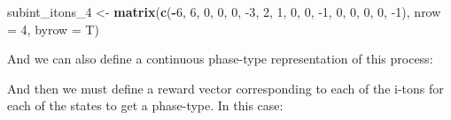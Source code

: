\documentclass[]{article}
\newenvironment{Shaded}{\begin{snugshade}}{\end{snugshade}}
\newcommand{\CommentTok}[1]{\textcolor[rgb]{0.56,0.35,0.01}{\textit{#1}}}
\newcommand{\DataTypeTok}[1]{\textcolor[rgb]{0.13,0.29,0.53}{#1}}
\newcommand{\DecValTok}[1]{\textcolor[rgb]{0.00,0.00,0.81}{#1}}
\newcommand{\KeywordTok}[1]{\textcolor[rgb]{0.13,0.29,0.53}{\textbf{#1}}}
\newcommand{\NormalTok}[1]{#1}
\newcommand{\OperatorTok}[1]{\textcolor[rgb]{0.81,0.36,0.00}{\textbf{#1}}}
\newcommand{\StringTok}[1]{\textcolor[rgb]{0.31,0.60,0.02}{#1}}
\begin{document}
\begin{Shaded}
\begin{Highlighting}[]
\NormalTok{subint_itons_}\DecValTok{4}\NormalTok{ <-}\StringTok{ }\KeywordTok{matrix}\NormalTok{(}\KeywordTok{c}\NormalTok{(}\OperatorTok{-}\DecValTok{6}\NormalTok{, }\DecValTok{6}\NormalTok{, }\DecValTok{0}\NormalTok{, }\DecValTok{0}\NormalTok{,}
                           \DecValTok{0}\NormalTok{, }\DecValTok{-3}\NormalTok{, }\DecValTok{2}\NormalTok{, }\DecValTok{1}\NormalTok{,}
                           \DecValTok{0}\NormalTok{, }\DecValTok{0}\NormalTok{, }\DecValTok{-1}\NormalTok{, }\DecValTok{0}\NormalTok{,}
                           \DecValTok{0}\NormalTok{, }\DecValTok{0}\NormalTok{, }\DecValTok{0}\NormalTok{, }\DecValTok{-1}\NormalTok{), }\DataTypeTok{nrow =} \DecValTok{4}\NormalTok{, }\DataTypeTok{byrow =}\NormalTok{ T)}
\end{Highlighting}
\end{Shaded}

And we can also define a continuous phase-type representation of this
process:

\begin{Shaded}
\end{Shaded}

And then we must define a reward vector corresponding to each of the
i-tons for each of the states to get a phase-type. In this case:
\end{document}
